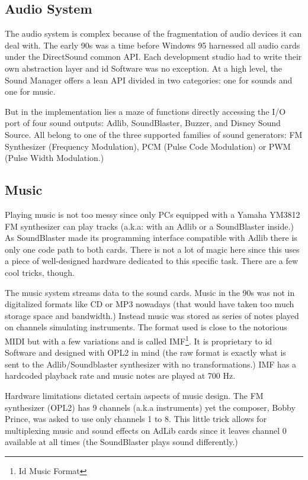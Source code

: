 \subsection{Audio System}
The audio system is complex because of the fragmentation of audio devices it can deal with. The early 90s was a time before Windows 95 harnessed all audio cards under the DirectSound common API. Each development studio had to write their own abstraction layer and id Software was no exception. At a high level, the Sound Manager offers a lean API divided in two categories: one for sounds and one for music.\\
\par
\begin{minipage}{\textwidth}

\end{minipage}
\par
But in the implementation lies a maze of functions directly accessing the I/O port of four sound outputs: Adlib, SoundBlaster, Buzzer, and Disney Sound Source. All belong to one of the three supported families of sound generators: FM Synthesizer (Frequency Modulation), PCM (Pulse Code Modulation) or PWM (Pulse Width Modulation.)\\


\subsection{Music}
Playing music is not too messy since only PCs equipped with a Yamaha YM3812 FM synthesizer can play tracks (a.k.a: with an Adlib or a SoundBlaster inside.) As SoundBlaster made its programming interface compatible with Adlib there is only one code path to both cards. There is not a lot of magic here since this uses a piece of well-designed hardware dedicated to this specific task. There are a few cool tricks, though.\\
\par
The music system streams data to the sound cards. Music in the 90s was not in digitalized formats like CD or MP3 nowadays (that would have taken too much storage space and bandwidth.) Instead music was stored as series of notes played on channels simulating instruments. The format used is close to the notorious MIDI but with a few variations and is called IMF\footnote{Id Music Format}. It is proprietary to id Software and designed with OPL2 in mind (the raw format is exactly what is sent to the Adlib/Soundblaster synthesizer with no transformations.) IMF has a hardcoded playback rate and music notes are played at 700 Hz.\\
\par
Hardware limitations dictated certain aspects of music design. The FM synthesizer (OPL2) has 9 channels (a.k.a instruments) yet the composer, Bobby Prince, was asked to use only channels 1 to 8. This little trick allows for multiplexing music and sound effects on AdLib cards since it leaves channel 0 available at all times (the SoundBlaster plays sound differently.)\\




